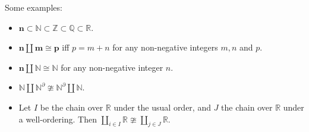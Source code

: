\documentclass[12pt]{article}
\begin{document}
Some examples:
\begin{itemize}
\item $\mathbf{n}\subset \mathbb{N}\subset \mathbb{Z}\subset \mathbb{Q}\subset \mathbb{R}$.
\item $\mathbf{n}\coprod \mathbf{m}\cong \mathbf{p}$ iff $p=m+n$ for any non-negative integers $m,n$ and $p$.
\item $\mathbf{n}\coprod \mathbb{N}\cong \mathbb{N}$ for any non-negative integer $n$.
\item $\mathbb{N}\coprod \mathbb{N}^{\partial}\ncong \mathbb{N}^{\partial}\coprod\mathbb{N}$.
\item Let $I$ be the chain over $\mathbb{R}$ under the usual order, and $J$ the chain over $\mathbb{R}$ under a well-ordering.  Then $\coprod_{i\in I}\mathbb{R}\ncong \coprod_{j\in J}\mathbb{R}$.
\end{itemize}
\end{document}
